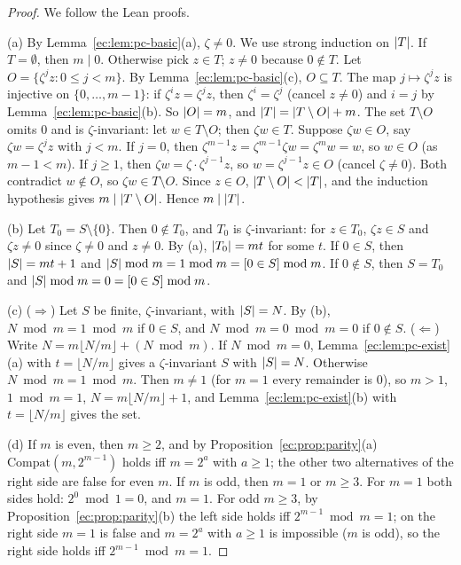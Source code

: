 \begin{proof}
We follow the Lean proofs.

(a) By Lemma~\ref{ec:lem:pc-basic}(a), $\zeta\ne0$. We use strong induction on $\lvert T\rvert$. If $T=\emptyset$, then
$m\mid0$. Otherwise pick $z\in T$; $z\ne0$ because $0\notin T$. Let $O=\{\zeta^jz:0\le j<m\}$. By
Lemma~\ref{ec:lem:pc-basic}(c), $O\subseteq T$. The map $j\mapsto\zeta^jz$ is injective on $\{0,\dots,m-1\}$: if
$\zeta^iz=\zeta^jz$, then $\zeta^i=\zeta^j$ (cancel $z\ne0$) and $i=j$ by Lemma~\ref{ec:lem:pc-basic}(b). So
$\lvert O\rvert=m$, and $\lvert T\rvert=\lvert T\setminus O\rvert+m$. The set $T\setminus O$ omits $0$ and is $\zeta$-invariant: let
$w\in T\setminus O$; then $\zeta w\in T$. Suppose $\zeta w\in O$, say $\zeta w=\zeta^jz$ with $j<m$. If $j=0$, then
$\zeta^{m-1}z=\zeta^{m-1}\zeta w=\zeta^mw=w$, so $w\in O$ (as $m-1<m$). If $j\ge1$, then
$\zeta w=\zeta\cdot\zeta^{j-1}z$, so $w=\zeta^{j-1}z\in O$ (cancel $\zeta\ne0$). Both contradict $w\notin O$, so
$\zeta w\in T\setminus O$. Since $z\in O$, $\lvert T\setminus O\rvert<\lvert T\rvert$, and the induction hypothesis gives
$m\mid\lvert T\setminus O\rvert$. Hence $m\mid\lvert T\rvert$.

(b) Let $T_0=S\setminus\{0\}$. Then $0\notin T_0$, and $T_0$ is $\zeta$-invariant: for $z\in T_0$, $\zeta z\in S$ and
$\zeta z\ne0$ since $\zeta\ne0$ and $z\ne0$. By (a), $\lvert T_0\rvert=mt$ for some $t$. If $0\in S$, then $\lvert S\rvert=mt+1$
and $\lvert S\rvert\bmod m=1\bmod m=[0\in S]\bmod m$. If $0\notin S$, then $S=T_0$ and $\lvert S\rvert\bmod m=0=[0\in S]\bmod m$.

(c) ($\Rightarrow$) Let $S$ be finite, $\zeta$-invariant, with $\lvert S\rvert=N$. By (b), $N\bmod m=1\bmod m$ if $0\in S$,
and $N\bmod m=0\bmod m=0$ if $0\notin S$. ($\Leftarrow$) Write $N=m\lfloor N/m\rfloor+(N\bmod m)$. If $N\bmod m=0$,
Lemma~\ref{ec:lem:pc-exist}(a) with $t=\lfloor N/m\rfloor$ gives a $\zeta$-invariant $S$ with $\lvert S\rvert=N$. Otherwise
$N\bmod m=1\bmod m$. Then $m\ne1$ (for $m=1$ every remainder is $0$), so $m>1$, $1\bmod m=1$, $N=m\lfloor N/m\rfloor+1$,
and Lemma~\ref{ec:lem:pc-exist}(b) with $t=\lfloor N/m\rfloor$ gives the set.

(d) If $m$ is even, then $m\ge2$, and by Proposition~\ref{ec:prop:parity}(a) $\mathrm{Compat}(m,2^{m-1})$ holds iff
$m=2^a$ with $a\ge1$; the other two alternatives of the right side are false for even $m$. If $m$ is odd, then $m=1$ or
$m\ge3$. For $m=1$ both sides hold: $2^0\bmod1=0$, and $m=1$. For odd $m\ge3$, by Proposition~\ref{ec:prop:parity}(b)
the left side holds iff $2^{m-1}\bmod m=1$; on the right side $m=1$ is false and $m=2^a$ with $a\ge1$ is impossible
($m$ is odd), so the right side holds iff $2^{m-1}\bmod m=1$.
\end{proof}

